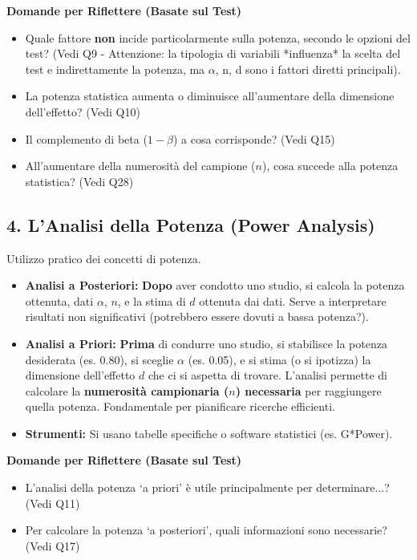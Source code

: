 \documentclass[12pt, a4paper]{article}
\newenvironment{reflectionbox}{%
    \medskip
    \begin{framed}\par\noindent
    \textbf{\color{boxtitlecolor}Domande per Riflettere (Basate sul Test)} \par
    \begin{itemize}[leftmargin=*, label=$\blacktriangleright$]
}{%
    \end{itemize}\par
    \end{framed}
    \medskip
}
\newcommand{\alphaerr}{\alpha} %
\newcommand{\betaerr}{\beta}  %
\begin{document}
\begin{reflectionbox}
    \item Quale fattore \textbf{non} incide particolarmente sulla potenza, secondo le opzioni del test? (Vedi Q9 - Attenzione: la tipologia di variabili *influenza* la scelta del test e indirettamente la potenza, ma $\alphaerr$, n, d sono i fattori diretti principali).
    \item La potenza statistica aumenta o diminuisce all'aumentare della dimensione dell'effetto? (Vedi Q10)
    \item Il complemento di beta ($1-\betaerr$) a cosa corrisponde? (Vedi Q15)
    \item All'aumentare della numerosità del campione ($n$), cosa succede alla potenza statistica? (Vedi Q28)
\end{reflectionbox}

\subsection*{4. L'Analisi della Potenza (Power Analysis)}
Utilizzo pratico dei concetti di potenza.
\begin{itemize}
    \item \textbf{Analisi a Posteriori:} \textbf{Dopo} aver condotto uno studio, si calcola la potenza ottenuta, dati $\alphaerr$, $n$, e la stima di $d$ ottenuta dai dati. Serve a interpretare risultati non significativi (potrebbero essere dovuti a bassa potenza?).
    \item \textbf{Analisi a Priori:} \textbf{Prima} di condurre uno studio, si stabilisce la potenza desiderata (es. 0.80), si sceglie $\alphaerr$ (es. 0.05), e si stima (o si ipotizza) la dimensione dell'effetto $d$ che ci si aspetta di trovare. L'analisi permette di calcolare la \textbf{numerosità campionaria ($n$) necessaria} per raggiungere quella potenza. Fondamentale per pianificare ricerche efficienti.
    \item \textbf{Strumenti:} Si usano tabelle specifiche o software statistici (es. G*Power).
\end{itemize}

\begin{reflectionbox}
    \item L'analisi della potenza `a priori' è utile principalmente per determinare...? (Vedi Q11)
    \item Per calcolare la potenza `a posteriori', quali informazioni sono necessarie? (Vedi Q17)
\end{reflectionbox}
\end{document}
